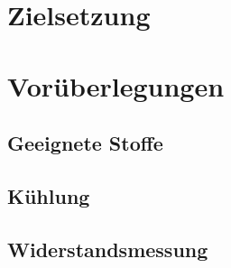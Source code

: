 \setcounter{page}{1}
\section*{Zielsetzung}

\section{Vorüberlegungen}

\subsection{Geeignete Stoffe}

\subsection{Kühlung}

\subsection{Widerstandsmessung}
